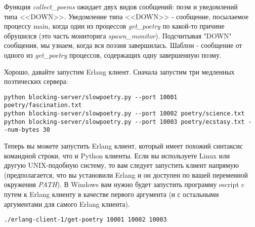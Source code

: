 Функция \textit{collect\_poems} ожидает двух видов 
сообщений: поэм и уведомлений типа <<DOWN>>. Уведомление типа <<DOWN>> - сообщение, 
посылаемое процессу main, когда один из процессов \textit{get\_poetry} 
по какой-то причине обрушился (это часть мониторига \textit{spawn\_monitor}). 
Подсчитывая "DOWN" сообщения, мы узнаем, когда вся поэзия завершилась. 
Шаблон - сообщение от одного из \textit{get\_poetry} процессов, 
содержащих одну завершенную поэму.

Хорошо, давайте  запустим Erlang клиент. Сначала запустим три медленных 
поэтических сервера:

 \begin{verbatim}
python blocking-server/slowpoetry.py --port 10001 poetry/fascination.txt
python blocking-server/slowpoetry.py --port 10002 poetry/science.txt
python blocking-server/slowpoetry.py --port 10003 poetry/ecstasy.txt --num-bytes 30
\end{verbatim} 


Теперь вы можете запустить Erlang клиент, который 
имеет похожий синтаксис командной строки, что и 
Python клиенты. Если вы используете Linux или другую 
UNIX-подобную систему, то вам следует запустить 
клиент напрямую (предполагается, что вы установили 
Erlang и он доступен по вашей переменной окружения \textit{PATH}). 
В Windows вам нужно будет запустить программу escript c путем к 
Erlang клиенту в качестве первого аргумента (и с остальными 
аргументами для самого Erlang клиента).

 \begin{verbatim}
./erlang-client-1/get-poetry 10001 10002 10003
\end{verbatim} 

